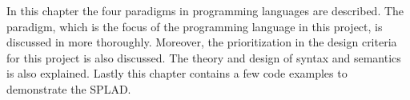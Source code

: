 In this chapter the four paradigms in programming languages are described. The paradigm, which is the focus of the programming language in this project, is discussed in more thoroughly. Moreover, the prioritization in the design criteria for this project is also discussed. The theory and design of syntax and semantics is also explained. Lastly this chapter contains a few code examples to demonstrate the SPLAD. 